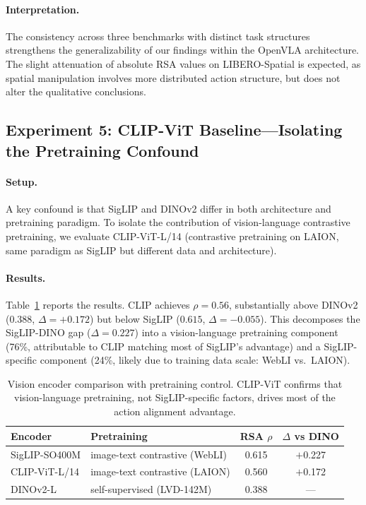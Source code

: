 \documentclass[letterpaper]{article}
\begin{document}
\paragraph{Interpretation.}
The consistency across three benchmarks with distinct task structures strengthens the generalizability of our findings within the OpenVLA architecture.
The slight attenuation of absolute RSA values on LIBERO-Spatial is expected, as spatial manipulation involves more distributed action structure, but does not alter the qualitative conclusions.


\subsection{Experiment 5: CLIP-ViT Baseline---Isolating the Pretraining Confound}
\label{sec:exp5}

\paragraph{Setup.}
A key confound is that SigLIP and DINOv2 differ in both architecture and pretraining paradigm.
To isolate the contribution of vision-language contrastive pretraining, we evaluate CLIP-ViT-L/14 (contrastive pretraining on LAION, same paradigm as SigLIP but different data and architecture).

\paragraph{Results.}
Table~\ref{tab:clip} reports the results.
CLIP achieves $\rho=0.56$, substantially above DINOv2 ($0.388$, $\Delta=+0.172$) but below SigLIP ($0.615$, $\Delta=-0.055$).
This decomposes the SigLIP-DINO gap ($\Delta=0.227$) into a vision-language pretraining component (76\%, attributable to CLIP matching most of SigLIP's advantage) and a SigLIP-specific component (24\%, likely due to training data scale: WebLI vs.\ LAION).

\begin{table}[t]
\centering
\caption{Vision encoder comparison with pretraining control. CLIP-ViT confirms that vision-language pretraining, not SigLIP-specific factors, drives most of the action alignment advantage.}
\label{tab:clip}
\small
\begin{tabular}{llcc}
\toprule
\textbf{Encoder} & \textbf{Pretraining} & \textbf{RSA $\rho$} & \textbf{$\Delta$ vs DINO} \\
\midrule
SigLIP-SO400M & image-text contrastive (WebLI) & 0.615 & $+$0.227 \\
CLIP-ViT-L/14 & image-text contrastive (LAION) & 0.560 & $+$0.172 \\
DINOv2-L & self-supervised (LVD-142M) & 0.388 & --- \\
\bottomrule
\end{tabular}
\end{table}
\end{document}
